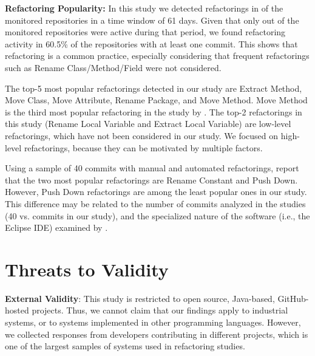 \noindent\textbf{Refactoring Popularity:}
In this study we detected refactorings in  
of the monitored repositories in a time window of 61 days. Given that only \activeProjects out of the \totalProjects monitored 
repositories were active during that period, we found refactoring activity in 60.5\% of the repositories with at least
one commit. This shows that refactoring is a common practice, especially considering that 
frequent refactorings such as {\textsc Rename Class/Method/Field} were not considered.

The top-5 most popular refactorings detected in our study are 
{\textsc Extract Method}, {\textsc Move Class}, {\textsc Move Attribute}, {\textsc Rename Package}, and {\textsc Move Method}.
{\textsc Move Method} is the third most popular refactoring in the study by \cite{negara2013}.
The top-2 refactorings in this study ({\textsc Rename Local Variable} and {\textsc Extract Local Variable}) are low-level refactorings, which have not been considered in our study.
We focused on high-level refactorings, because they can be motivated by multiple factors.

Using a sample of 40 commits with manual and automated refactorings, \cite{MurphyHill2012} report that the two most popular refactorings are {\textsc Rename Constant} and {\textsc Push Down}. 
However, {\textsc Push Down} refactorings are among the least popular ones in our study. This difference 
may be related to the number of commits analyzed in the studies (40 vs. \commitsWithTruePositiveRefactoring commits in our study),
and the specialized nature of the software (i.e., the Eclipse IDE) examined by \cite{MurphyHill2012}.




\section{Threats to Validity}

\noindent \textbf{External Validity}: This study is restricted to open source, Java-based, GitHub-hosted projects. Thus, 
we cannot claim that our findings apply to industrial systems, or to systems implemented in other programming languages.
However, we collected responses from \studiedDevelopers developers contributing in \studiedProjects different projects, which is one of the largest samples
of systems used in refactoring studies.\margin

